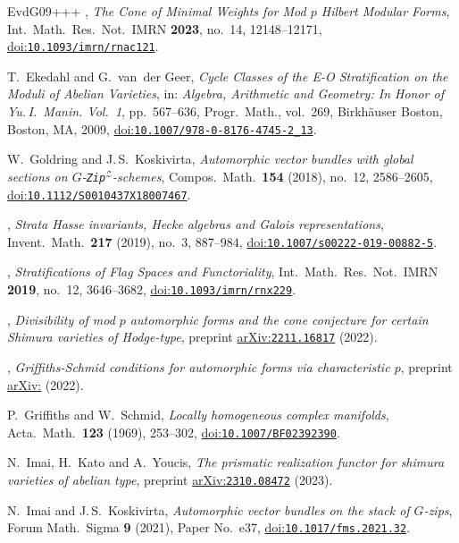 \documentclass[10pt,a4paper]{article}
\numberwithin{equation}{section}
\newcommand{\doi}[1]{\href{https://doi.org/#1}{doi:\nolinkurl{#1}}}
\newcommand{\arXiv}[1]{\href{https://arxiv.org/abs/#1}{arXiv:\nolinkurl{#1}}}
\theoremstyle{definition}
\theoremstyle{remark}
\begin{document}
\begin{thebibliography}{EvdG09+++}
\bysame, \emph{The {C}one of {M}inimal {W}eights for {M}od $p$ {H}ilbert
  {M}odular {F}orms}, Int.\ Math.\ Res.\ Not.\ IMRN \textbf{2023}, no.~14, 12148--12171, 
\doi{10.1093/imrn/rnac121}.

T.~Ekedahl and G.~van~der Geer, \emph{Cycle Classes of the {E}-{O}
  Stratification on the Moduli of Abelian Varieties}, in: \emph{Algebra, Arithmetic and  Geometry: In Honor of Yu.\,I.~Manin. Vol.~1}, pp.~567--636, 
  Progr.\ Math., vol.~269, Birkh\"auser Boston, Boston, MA, 2009, 
\doi{10.1007/978-0-8176-4745-2_13}.

W.~Goldring and J.\,S.~Koskivirta, \emph{Automorphic vector bundles with global
  sections on {$G$}-{\tt Zip}$^{{\mathcal{Z}}}$-schemes}, Compos.\ Math.\
  \textbf{154} (2018), no.~12, 2586--2605,
  \doi{10.1112/S0010437X18007467}.
  
\bysame, \emph{Strata {H}asse invariants, {H}ecke algebras and {G}alois
  representations}, Invent.\ Math.\ \textbf{217} (2019), no.~3, 887--984, 
\doi{10.1007/s00222-019-00882-5}.

\bysame, \emph{Stratifications of Flag Spaces and Functoriality}, Int.\ Math.\ Res.\ Not.\ IMRN
\textbf{2019}, no.~12, 3646--3682, \doi{10.1093/imrn/rnx229}.

\bysame, \emph{Divisibility of mod $p$ automorphic forms and the cone
conjecture for certain {S}himura varieties of {H}odge-type}, preprint \arXiv{2211.16817} (2022). 

\bysame, \emph{Griffiths-{S}chmid conditions for automorphic forms via
characteristic $p$}, preprint
\href{https://arxiv.org/abs/2211.16819}{{arXiv:}} (2022).


P.~Griffiths and W.~Schmid, \emph{Locally homogeneous complex manifolds}, Acta.\
  Math.\ \textbf{123} (1969), 253--302, 
\doi{10.1007/BF02392390}.

N.~Imai, H.~Kato and A.~Youcis, \emph{The prismatic realization functor for
shimura varieties of abelian type}, preprint \arXiv{2310.08472} (2023).

\bibitem[IK21]{Imai-Koskivirta-vector-bundles}
N.~Imai and J.\,S.~Koskivirta, \emph{Automorphic vector bundles on the stack of
  $G$-zips}, Forum Math.\ Sigma \textbf{9} (2021), Paper No.~e37, 
\doi{10.1017/fms.2021.32}.


\end{thebibliography}
\end{document}
